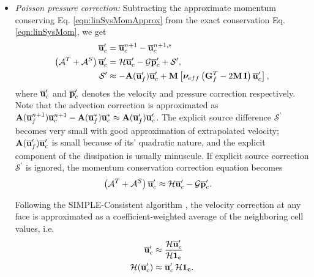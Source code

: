\begin{enumerate}
\begin{itemize}
\item \textit{Poisson pressure correction:} Subtracting the approximate momentum conserving Eq. \eqref{eqn:linSysMomApprox} from the exact conservation Eq. \eqref{eqn:linSysMom}, we get
\begin{align}
\begin{split}
\overline{\mathbf{u}}_c^\prime &= \overline{\mathbf{u}}_c^{n+1} - \overline{\mathbf{u}}_c^{n+1, *}
\\
\left( \mathcal{A}^T + \mathcal{A}^S \right) \overline{\mathbf{u}}_c^\prime &= \mathcal{H}\overline{\mathbf{u}}_c^\prime -\mathcal{G}\overline{\mathbf{p}}_c^\prime + \mathcal{S}^{\prime},
\\
\mathcal{S}^{\prime} &\approx -\mathbf{A}(\overline{\mathbf{u}}_f^\prime) {\overline{\mathbf{u}}_c^\prime} + \mathbf{M} \left[ \boldsymbol{\nu}_{eff} \left( \mathbf{G}_f^T - 2\mathbf{M}\,\mathbf{I} \right) {\overline{\mathbf{u}}_c^\prime} \right],
\end{split}
\label{eqn:linSysDiff}
\end{align}
where $\overline{\mathbf{u}}_c^\prime$ and $\overline{\mathbf{p}}_c^\prime$ denotes the velocity and pressure correction respectively. Note that the advection correction is approximated as $\mathbf{A}(\overline{\mathbf{u}}_f^{n+1}) {\overline{\mathbf{u}}_c^{n+1}} - \mathbf{A}(\overline{\mathbf{u}}_f^*) {\overline{\mathbf{u}}_c^*} \approx \mathbf{A}(\overline{\mathbf{u}}_f^\prime) {\overline{\mathbf{u}}_c^\prime}$. The explicit source difference $\mathcal{S}^{\prime}$ becomes very small with good approximation of extrapolated velocity; $\mathbf{A}(\overline{\mathbf{u}}_f^\prime) {\overline{\mathbf{u}}_c^\prime}$ is small because of its' quadratic nature, and the explicit component of the dissipation is usually minuscule. If explicit source correction $\mathcal{S}^{\prime}$ is ignored, the momentum conservation correction equation becomes
\begin{align}
\left( \mathcal{A}^T + \mathcal{A}^S \right) \overline{\mathbf{u}}_c^\prime &\approx \mathcal{H}\overline{\mathbf{u}}_c^\prime -\mathcal{G}\overline{\mathbf{p}}_c^\prime.
\label{eqn:linSysMomCorrAll}
\end{align}

Following the SIMPLE-Consistent algorithm \cite{vanDoormaal1984}, the velocity correction at any face is approximated as a coefficient-weighted average of the neighboring cell values, i.e.
\begin{align}
\begin{split}
\overline{\mathbf{u}}_c^\prime &\approx \frac{\mathcal{H}\overline{\mathbf{u}}_c^\prime}{\mathcal{H}\mathbf{1_c}}
\\
\mathcal{H}(\overline{\mathbf{u}}_c^\prime) &\approx \overline{\mathbf{u}}_c^\prime \, \mathcal{H}\mathbf{1_c}.
\end{split}
\label{eqn:H1}
\end{align}


\end{itemize}
\end{enumerate}
